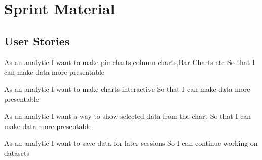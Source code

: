 \section{Sprint Material} %
\label{sec:Sprint Material}
\subsection{User Stories} 
As an analytic
I want to make pie charts,column charts,Bar Charts etc
So that I can make data more presentable

As an analytic
I want to make charts interactive 
So that I can make data more presentable

As an analytic
I want a way to show selected data from the chart
So that I can make data more presentable

As an analytic
I want to save data for later sessions
So I can continue working on datasets

